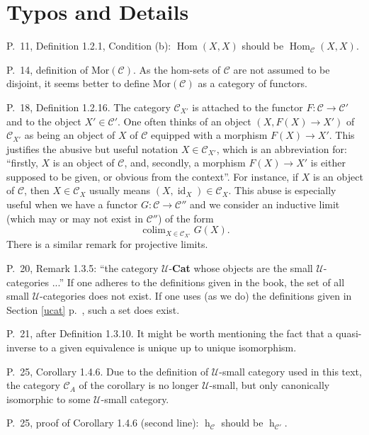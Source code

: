 \documentclass[12pt]{article}
\theoremstyle{remark}
\theoremstyle{definition}
\newcommand{\n}{\noindent}
\newcommand{\C}{\mathcal C}
\newcommand{\U}{\mathcal U}
\DeclareMathOperator*{\coli}{colim}
\DeclareMathOperator{\hy}{h}
\DeclareMathOperator{\id}{id}
\DeclareMathOperator{\Hom}{Hom}
\begin{document}
\centerline{}
%
\section{Typos and Details} %
%
P.~11, Definition 1.2.1, Condition (b): $\Hom(X,X)$ should be $\Hom_{\C}(X,X)$. 

\n P.~14, definition of $\text{Mor}(\C)$. As the hom-sets of $\C$ are not assumed to be disjoint, it seems better to define $\text{Mor}(\C)$ as a category of functors. 


\n P.~18, Definition 1.2.16. The category $\C_{X'}$ is attached to the functor $F:\C\to\C'$ and to the object $X'\in\C'$. One often thinks of an object $(X,F(X)\to X')$ of $\C_{X'}$ as being an object of $X$ of $\C$ equipped with a morphism $F(X)\to X'$. This justifies the abusive but useful notation $X\in\C_{X'}$, which is an abbreviation for: ``firstly, $X$ is an object of $\C$, and, secondly, a morphism $F(X)\to X'$ is either supposed to be given, or obvious from the context''. For instance, if $X$ is an object of $\C$, then $X\in\C_X$ usually means $(X,\id_X)\in\C_X$. This abuse is especially useful when we have a functor $G:\C\to\C''$ and we consider an inductive limit (which may or may not exist in $\C''$) of the form 
%
\begin{equation}\label{convnot}
\coli_{X\in\C_{X'}}G(X).  
\end{equation}
% 
There is a similar remark for projective limits. 


\n P.~20, Remark 1.3.5: ``the category $\U$-\textbf{Cat} whose objects are the small $\U$-categories ...'' If one adheres to the definitions given in the book, the set of all small $\U$-categories does not exist. If one uses (as we do) the definitions given in Section \ref{ucat} p.~\pageref{ucat}, such a set does exist. 

\n P.~21, after Definition 1.3.10. It might be worth mentioning the fact that a quasi-inverse to a given equivalence is unique up to unique isomorphism. 

\n P.~25, Corollary 1.4.6. Due to the definition of $\U$-small category used in this text, the category $\C_A$ of the corollary is no longer $\U$-small, but only canonically isomorphic to some $\U$-small category.

\n P.~25, proof of Corollary 1.4.6 (second line): $\hy_{\C}$ should be $\hy_{\C'}$. 
\end{document}
